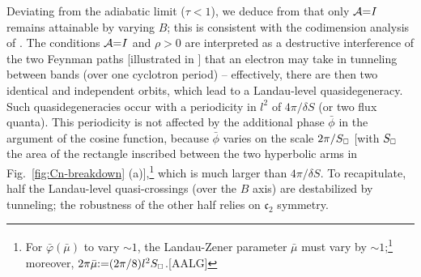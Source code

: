 \documentclass[aps, prb, showpacs, twocolumn, notitlepage, superscriptaddress]{revtex4-1}
\begin{document}
Deviating from the adiabatic limit ($\tau{<}1$), we deduce from  that only ${\cal A}{=}I$ remains attainable by varying $B$; this is consistent with the codimension analysis of . The conditions ${\cal A}{=}I$ and $\rho{>}0$ are interpreted as a destructive interference of the two Feynman paths [illustrated in \red{[Fig]}] that an electron may take in tunneling between bands (over one cyclotron period) -- effectively, there are then two identical and independent orbits, which lead to a Landau-level quasidegeneracy. Such quasidegeneracies occur with  a periodicity in $l^2$ of $4\pi/\delta S$ (or two flux quanta). This periodicity is not affected by the additional phase $\bar{\phi}$ in the argument of the cosine function, because $\bar{\phi}$  varies on the scale  $2\pi/S_{\scriptscriptstyle{\square}}$ [with  $S_{\scriptscriptstyle{\square}}$ the area of the rectangle inscribed between the two hyperbolic arms  in Fig.\ \ref{fig:Cn-breakdown} (a)],\footnote{For $\bar{\varphi}(\bar{\mu})$ to vary  $\sim 1$, the Landau-Zener parameter $\bar{\mu}$ must vary by $\sim 1$;\footnote{See Fig.\ 10 in 100page} moreover, $2\pi\bar{\mu}{:}{=} (2\pi/8) l^2S_{\scriptscriptstyle{\square}}$.[AALG]} which is much larger than
 $4\pi/\delta S$. To recapitulate, half the Landau-level quasi-crossings (over the $B$ axis) are destabilized by tunneling; the robustness of the other half relies on $\mathfrak{c}_2$ symmetry.








\end{document}

